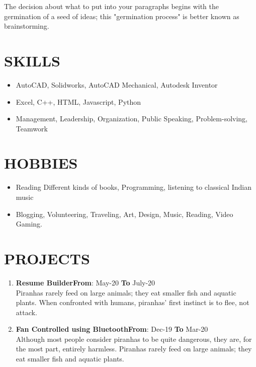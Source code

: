 \documentclass{article}
\begin{document}
\vspace{3pt}
The decision about what to put into your paragraphs begins with the germination of a seed of ideas; this "germination process" is better known as brainstorming.
\vspace{3pt}

\section*{\large{\uppercase{Skills}}}

\vspace{3pt}
\begin{itemize}[noitemsep,nolistsep]
	\item AutoCAD, Solidworks, AutoCAD Mechanical, Autodesk Inventor
	\item Excel, C++, HTML, Javascript, Python
	\item Management, Leadership, Organization, Public Speaking, Problem-solving, Teamwork
\end{itemize}
\vspace{3pt}

\section*{\large{\uppercase{Hobbies}}}

\vspace{3pt}
\begin{itemize}[noitemsep,nolistsep]
	\item Reading Different kinds of books, Programming, listening to classical Indian music
	\item Blogging, Volunteering, Traveling, Art, Design, Music, Reading, Video Gaming.
\end{itemize}

\vspace{3pt}
\section*{\large{\uppercase{projects}}}

\vspace{3pt}
\begin{enumerate}
	\item {\textbf{Resume Builder}}\hfill {\textbf{From}}: May-20 {\textbf{To}} July-20\\
	Piranhas rarely feed on large animals; they eat smaller fish and aquatic plants. When confronted with humans, piranhas' first instinct is to flee, not attack. 
	\item {\textbf{Fan Controlled using Bluetooth}}\hfill {\textbf{From}}: Dec-19 {\textbf{To}} Mar-20\\
	Although most people consider piranhas to be quite dangerous, they are, for the most part, entirely harmless. Piranhas rarely feed on large animals; they eat smaller fish and aquatic plants.
\end{enumerate}
	
\end{document}
